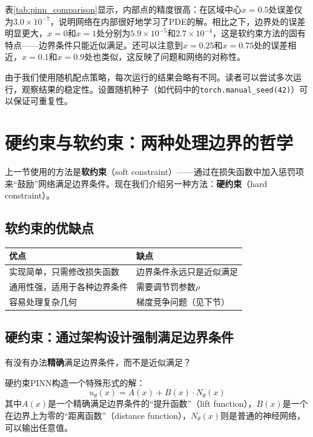 表\ref{tab:pinn_comparison}显示，内部点的精度很高：在区域中心$x=0.5$处误差仅为$3.0 \times 10^{-7}$，说明网络在内部很好地学习了PDE的解。相比之下，边界处的误差明显更大，$x=0$和$x=1$处分别为$5.9 \times 10^{-5}$和$2.7 \times 10^{-4}$，这是软约束方法的固有特点——边界条件只能近似满足。还可以注意到$x=0.25$和$x=0.75$处的误差相近，$x=0.1$和$x=0.9$处也类似，这反映了问题和网络的对称性。

\begin{remark}[训练的随机性]
由于我们使用随机配点策略，每次运行的结果会略有不同。读者可以尝试多次运行，观察结果的稳定性。设置随机种子（如代码中的\texttt{torch.manual\_seed(42)}）可以保证可重复性。
\end{remark}

\section{硬约束与软约束：两种处理边界的哲学}

上一节使用的方法是\textbf{软约束}（soft constraint）——通过在损失函数中加入惩罚项来“鼓励”网络满足边界条件。现在我们介绍另一种方法：\textbf{硬约束}（hard constraint）。

\subsection{软约束的优缺点}

\begin{center}
\begin{tabular}{p{6cm}|p{6cm}}
\hline
\textbf{优点} & \textbf{缺点} \\
\hline
实现简单，只需修改损失函数 & 边界条件永远只是近似满足 \\
通用性强，适用于各种边界条件 & 需要调节罚参数$\rho$ \\
容易处理复杂几何 & 梯度竞争问题（见下节） \\
\hline
\end{tabular}
\end{center}

\subsection{硬约束：通过架构设计强制满足边界条件}

有没有办法\textbf{精确}满足边界条件，而不是近似满足？

\begin{definition}[硬约束PINN]
硬约束PINN构造一个特殊形式的解：
\begin{equation}
    u_\theta(x) = A(x) + B(x) \cdot N_\theta(x)
\end{equation}
其中$A(x)$是一个精确满足边界条件的“提升函数”（lift function），$B(x)$是一个在边界上为零的“距离函数”（distance function），$N_\theta(x)$则是普通的神经网络，可以输出任意值。
\end{definition}


